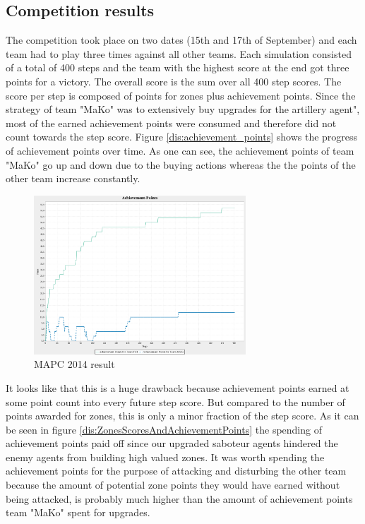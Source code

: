 \subsection{Competition results}
The competition took place on two dates (15th and 17th of September) and each team had to play three times against all other teams. Each simulation consisted of a total of 400 steps and the team with the highest score at the end got three points for a victory. The overall score is the sum over all 400 step scores. The score per step is composed of points for zones plus achievement points. Since the strategy of team "MaKo" was to extensively buy upgrades for the artillery agent", most of the earned achievement points were consumed and therefore did not count towards the step score. Figure \autoref{dis:achievement_points} shows the progress of achievement points over time. As one can see, the achievement points of team "MaKo" go up and down due to the buying actions whereas the the points of the other team increase constantly. 
\begin{figure}[h]
	\centering
	\includegraphics[width=300px]{images/AchievementPoints.png}
	\caption{MAPC 2014 result}
	\label{dis:achievement_points}
\end{figure}
It looks like that this is a huge drawback because achievement points earned at some point count into every future step score. But compared to the number of points awarded for zones, this is only a minor fraction of the step score. As it can be seen in figure \autoref{dis:ZonesScoresAndAchievementPoints} the spending of achievement points paid off since our upgraded saboteur agents hindered the enemy agents from building high valued zones. It was worth spending the achievement points for the purpose of attacking and disturbing the other team because the amount of potential zone points they would have earned without being attacked, is probably much higher than the amount of achievement points team "MaKo" spent for upgrades.
